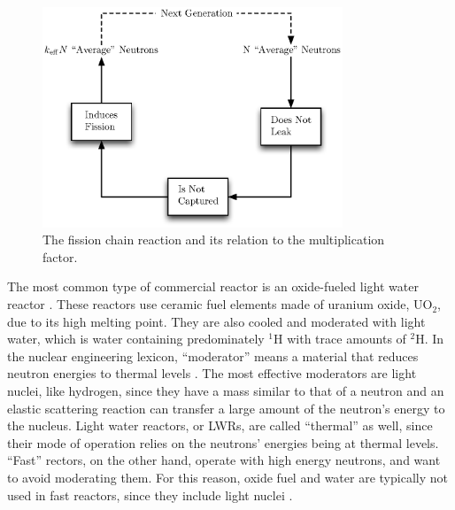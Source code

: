 \begin{figure}[h!]
  \centering
    \includegraphics[width=0.8\textwidth]{graphics/k_chain.eps}
     \caption{The fission chain reaction and its relation to the multiplication factor. \label{k_chain}}
\end{figure}

The most common type of commercial reactor is an oxide-fueled light water reactor \cite{reactor_numbers}.   These reactors use ceramic fuel elements made of uranium oxide, UO$_2$, due to its high melting point.  They are also cooled and moderated with light water, which is water containing predominately $^1$H with trace amounts of $^2$H.  In the nuclear engineering lexicon, ``moderator'' means a material that reduces neutron energies to thermal levels \cite{duderstadt}.  The most effective moderators are light nuclei, like hydrogen, since they have a mass similar to that of a neutron and an elastic scattering reaction can transfer a large amount of the neutron's energy to the nucleus.  Light water reactors, or LWRs, are called ``thermal'' as well, since their mode of operation relies on the neutrons' energies being at thermal levels.  ``Fast'' rectors, on the other hand, operate with high energy neutrons, and want to avoid moderating them.  For this reason, oxide fuel and water are typically not used in fast reactors, since they include light nuclei \cite{duderstadt}.


